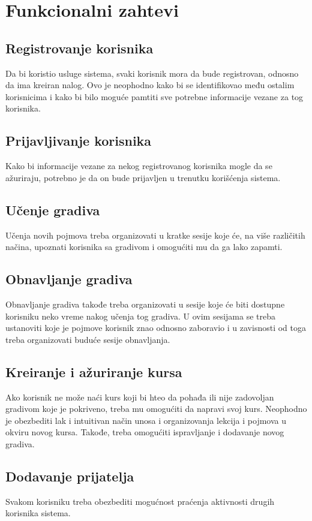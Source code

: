 \chapter{Funkcionalni zahtevi}

\section{Registrovanje korisnika}
Da bi koristio usluge sistema, svaki korisnik mora da bude registrovan, odnosno da ima kreiran nalog. Ovo je neophodno kako bi se identifikovao među ostalim korisnicima i kako bi bilo moguće pamtiti sve potrebne informacije vezane za tog korisnika.

\section{Prijavljivanje korisnika}
Kako bi informacije vezane za nekog registrovanog korisnika mogle da se ažuriraju, potrebno je da on bude prijavljen u trenutku korišćenja sistema.

\section{Učenje gradiva}
Učenja novih pojmova treba organizovati u kratke sesije koje će, na više različitih načina, upoznati korisnika sa gradivom i omogućiti mu da ga lako zapamti.

\section{Obnavljanje gradiva}
Obnavljanje gradiva takođe treba organizovati u sesije koje će biti dostupne korisniku neko vreme nakog učenja tog gradiva. U ovim sesijama se treba ustanoviti koje je pojmove korisnik znao odnosno zaboravio i u zavisnosti od toga treba organizovati buduće sesije obnavljanja.

\section{Kreiranje i ažuriranje kursa}
Ako korisnik ne može naći kurs koji bi hteo da pohađa ili nije zadovoljan gradivom koje je pokriveno, treba mu omogućiti da napravi svoj kurs. Neophodno je obezbediti lak i intuitivan način unosa i organizovanja lekcija i pojmova u okviru novog kursa. Takođe, treba omogućiti ispravljanje i dodavanje novog gradiva.

\section{Dodavanje prijatelja}
Svakom korisniku treba obezbediti mogućnost praćenja aktivnosti drugih korisnika sistema.

